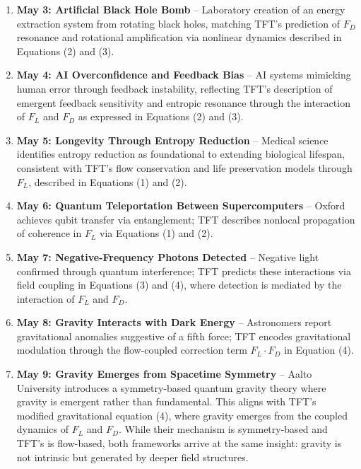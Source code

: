 \documentclass[11pt]{article}
\begin{document}
\begin{enumerate}
\item \textbf{May 3: Artificial Black Hole Bomb} – Laboratory creation of an energy extraction system from rotating black holes, matching TFT's prediction of \(F_D\) resonance and rotational amplification via nonlinear dynamics described in Equations (2) and (3).

\item \textbf{May 4: AI Overconfidence and Feedback Bias} – AI systems mimicking human error through feedback instability, reflecting TFT's description of emergent feedback sensitivity and entropic resonance through the interaction of \(F_L\) and \(F_D\) as expressed in Equations (2) and (3).

\item \textbf{May 5: Longevity Through Entropy Reduction} – Medical science identifies entropy reduction as foundational to extending biological lifespan, consistent with TFT's flow conservation and life preservation models through \(F_L\), described in Equations (1) and (2).

\item \textbf{May 6: Quantum Teleportation Between Supercomputers} – Oxford achieves qubit transfer via entanglement; TFT describes nonlocal propagation of coherence in \(F_L\) via Equations (1) and (2).

\item \textbf{May 7: Negative-Frequency Photons Detected} – Negative light confirmed through quantum interference; TFT predicts these interactions via field coupling in Equations (3) and (4), where detection is mediated by the interaction of \(F_L\) and \(F_D\).

\item \textbf{May 8: Gravity Interacts with Dark Energy} – Astronomers report gravitational anomalies suggestive of a fifth force; TFT encodes gravitational modulation through the flow-coupled correction term \(F_L \cdot F_D\) in Equation (4).


\item \textbf{May 9: Gravity Emerges from Spacetime Symmetry} – Aalto University introduces a symmetry-based quantum gravity theory where gravity is emergent rather than fundamental. This aligns with TFT's modified gravitational equation (4), where gravity emerges from the coupled dynamics of \(F_L\) and \(F_D\). While their mechanism is symmetry-based and TFT’s is flow-based, both frameworks arrive at the same insight: gravity is not intrinsic but generated by deeper field structures.

\end{enumerate}
\end{document}
